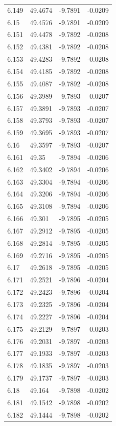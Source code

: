 \begin{tabular}{llll}
6.149 & 49.4674 & -9.7891 & -0.0209 \\
6.15 & 49.4576 & -9.7891 & -0.0209 \\
6.151 & 49.4478 & -9.7892 & -0.0208 \\
6.152 & 49.4381 & -9.7892 & -0.0208 \\
6.153 & 49.4283 & -9.7892 & -0.0208 \\
6.154 & 49.4185 & -9.7892 & -0.0208 \\
6.155 & 49.4087 & -9.7892 & -0.0208 \\
6.156 & 49.3989 & -9.7893 & -0.0207 \\
6.157 & 49.3891 & -9.7893 & -0.0207 \\
6.158 & 49.3793 & -9.7893 & -0.0207 \\
6.159 & 49.3695 & -9.7893 & -0.0207 \\
6.16 & 49.3597 & -9.7893 & -0.0207 \\
6.161 & 49.35 & -9.7894 & -0.0206 \\
6.162 & 49.3402 & -9.7894 & -0.0206 \\
6.163 & 49.3304 & -9.7894 & -0.0206 \\
6.164 & 49.3206 & -9.7894 & -0.0206 \\
6.165 & 49.3108 & -9.7894 & -0.0206 \\
6.166 & 49.301 & -9.7895 & -0.0205 \\
6.167 & 49.2912 & -9.7895 & -0.0205 \\
6.168 & 49.2814 & -9.7895 & -0.0205 \\
6.169 & 49.2716 & -9.7895 & -0.0205 \\
6.17 & 49.2618 & -9.7895 & -0.0205 \\
6.171 & 49.2521 & -9.7896 & -0.0204 \\
6.172 & 49.2423 & -9.7896 & -0.0204 \\
6.173 & 49.2325 & -9.7896 & -0.0204 \\
6.174 & 49.2227 & -9.7896 & -0.0204 \\
6.175 & 49.2129 & -9.7897 & -0.0203 \\
6.176 & 49.2031 & -9.7897 & -0.0203 \\
6.177 & 49.1933 & -9.7897 & -0.0203 \\
6.178 & 49.1835 & -9.7897 & -0.0203 \\
6.179 & 49.1737 & -9.7897 & -0.0203 \\
6.18 & 49.164 & -9.7898 & -0.0202 \\
6.181 & 49.1542 & -9.7898 & -0.0202 \\
6.182 & 49.1444 & -9.7898 & -0.0202 \\

\end{tabular}
